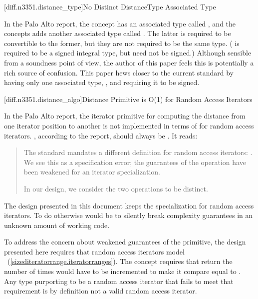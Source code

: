 [diff.n3351.distance_type]{No Distinct DistanceType Associated Type}

\pnum
In the Palo Alto report, the  concept has an associated type called
, and the  concepts adds another associated type
called . The latter is required to be convertible to the former, but they are
not required to be the same type. ( is required to be a signed integral type,
but  need not be signed.) Although sensible from a soundness point of view,
the author of this paper feels this is potentially a rich source of confusion. This paper hews
closer to the current standard by having only one associated type, , and
requiring it to be signed.

[diff.n3351.distance_algo]{Distance Primitive is O(1) for Random Access Iterators}

\pnum
In the Palo Alto report, the  iterator primitive for computing the distance from one
iterator position to another is not implemented in terms of  for random access
iterators. , according to the report, should always be . It reads:

\begin{quote}
The standard mandates a different definition for random access iterators:
. We see this as a specification error; the guarantees of the
 operation have been weakened for an iterator specialization.

In our design, we consider the two operations to be distinct.
\end{quote}

The design presented in this document keeps the specialization for random access iterators. To do
otherwise would be to silently break complexity guarantees in an unknown amount of working code.

To address the concern about weakened guarantees of the  primitive, the design
presented here requires that random access iterators model
~(\ref{sizediteratorrange.iteratorranges}). The 
concept requires that  return the number of times  would have to be
incremented to make it compare equal to . Any type purporting to be a random access
iterator that fails to meet that requirement is by definition not a valid random access iterator.

